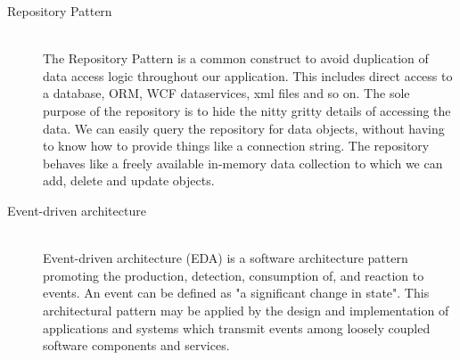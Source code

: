 \begin{description}
 \item[Repository Pattern] \hfill \\
The Repository Pattern is a common construct to avoid duplication of data access logic throughout our application. This includes direct access to a database, ORM, WCF dataservices, xml files and so on. The sole purpose of the repository is to hide the nitty gritty details of accessing the data. We can easily query the repository for data objects, without having to know how to provide things like a connection string. The repository behaves like a freely available in-memory data collection to which we can add, delete and update objects.


 \item[Event-driven architecture] \hfill \\
Event-driven architecture (EDA) is a software architecture pattern promoting the production, detection, consumption of, and reaction to events. An event can be defined as "a significant change in state". This architectural pattern may be applied by the design and implementation of applications and systems which transmit events among loosely coupled software components and services.

\end{description}
\label{chapter:ThisIsMyAppendixChapter}
